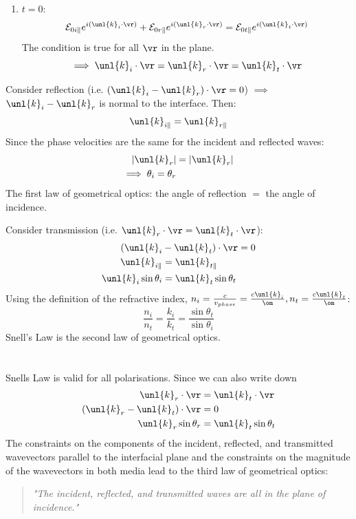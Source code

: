 \documentclass[a4paper, 11pt, normalem]{report}
\renewcommand\E{\mathcal{E}}
\newcommand\vk{\unl{k}}
\begin{document}
\begin{enumerate}
	\item $t=0$:
	\begin{equation}
		\E_{0i\parallel}e^{i(\vk_i\cdot\vr)} + \E_{0r\parallel}e^{i(\vk_r\cdot\vr)} = \E_{0t\parallel}e^{i(\vk_t\cdot\vr)}
	\end{equation}
	The condition is true for all $\vr$ in the plane.
	\begin{equation}
		\implies \vk_i\cdot\vr = \vk_r\cdot\vr = \vk_t\cdot\vr
	\end{equation}
\end{enumerate}
Consider reflection (i.e. $(\vk_i - \vk_r)\cdot\vr = 0$) $\implies$ $\vk_i - \vk_r$ is normal to the interface. Then:
\begin{equation}
	\vk_{i\parallel} = \vk_{r\parallel}
\end{equation}
Since the phase velocities are the same for the incident and reflected waves:
\begin{align}
	|\vk_r| &= |\vk_r| \\
	\implies \theta_i = \theta_r
\end{align}
The first law of geometrical optics: the angle of reflection $=$ the angle of incidence.

Consider transmission (i.e. $\vk_r\cdot\vr = \vk_t\cdot\vr$):
\begin{align}
	(\vk_i &- \vk_t)\cdot\vr = 0 \\
	\vk_{i\parallel} &= \vk_{t\parallel} \\
	\vk_i\sin\theta_i &= \vk_t\sin\theta_t
\end{align}
Using the definition of the refractive index, $n_i = \frac{c}{v_{phase}} = \frac{c\vk_i}{\om}, n_t = \frac{c\vk_t}{\om}$:
\begin{equation}
	\frac{n_i}{n_t} = \frac{k_i}{k_t} = \frac{\sin\theta_t}{\sin\theta_i} \tag{Snell's Law}
\end{equation}
Snell's Law is the second law of geometrical optics.

\chapter{}
Snells Law is valid for all polarisations.
Since we can also write down
\begin{align}
	\vk_r\cdot \vr &= \vk_t\cdot \vr \\
	(\vk_r - \vk_t)\cdot\vr &= 0 \\
	\vk_r\sin\theta_r &= \vk_t\sin\theta_t
\end{align}
The constraints on the components of the incident, reflected, and transmitted wavevectors parallel to the interfacial plane and the constraints on the magnitude of the wavevectors in both media lead to the third law of geometrical optics:
\begin{quote}
\emph{"The incident, reflected, and transmitted waves are all in the plane of incidence."}
\end{quote}
\end{document}
